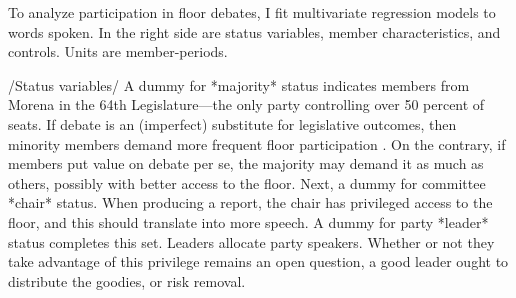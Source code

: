 \documentclass[letter,12pt]{article}
\begin{document}









To analyze participation in floor debates, I fit multivariate regression models to words spoken. In the right side are status variables, member characteristics, and controls. Units are member-periods. 

/Status variables/ A dummy for *majority* status indicates members from Morena in the 64th Legislature---the only party controlling over 50 percent of seats. If debate is an (imperfect) substitute for legislative outcomes, then minority members demand more frequent floor participation \citep{proksch-slapin2015book}. On the contrary, if members put value on debate per se, the majority may demand it as much as others, possibly with better access to the floor. Next, a dummy for committee *chair* status. When producing a report, the chair has privileged access to the floor, and this should translate into more speech. A dummy for party *leader* status completes this set. Leaders allocate party speakers. Whether or not they take advantage of this privilege remains an open question, a good leader ought to distribute the goodies, or risk removal. 
\end{document}
